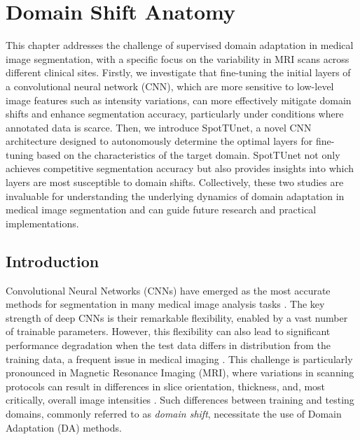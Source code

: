 

\chapter{Domain Shift Anatomy}
\label{chap:mri}


This chapter addresses the challenge of supervised domain adaptation in medical image segmentation, with a specific focus on the variability in MRI scans across different clinical sites. Firstly, we investigate that fine-tuning the initial layers of a convolutional neural network (CNN), which are more sensitive to low-level image features such as intensity variations, can more effectively mitigate domain shifts and enhance segmentation accuracy, particularly under conditions where annotated data is scarce. Then, we introduce SpotTUnet, a novel CNN architecture designed to autonomously determine the optimal layers for fine-tuning based on the characteristics of the target domain. SpotTUnet not only achieves competitive segmentation accuracy but also provides insights into which layers are most susceptible to domain shifts. Collectively, these two studies are invaluable for understanding the underlying dynamics of domain adaptation in medical image segmentation and can guide future research and practical implementations.


\section{Introduction}

Convolutional Neural Networks (CNNs) have emerged as the most accurate methods for segmentation in many medical image analysis tasks \cite{shen2017deep}. The key strength of deep CNNs is their remarkable flexibility, enabled by a vast number of trainable parameters. However, this flexibility can also lead to significant performance degradation when the test data differs in distribution from the training data, a frequent issue in medical imaging \cite{wang2018deep}. This challenge is particularly pronounced in Magnetic Resonance Imaging (MRI), where variations in scanning protocols can result in differences in slice orientation, thickness, and, most critically, overall image intensities \cite{kamnitsas2017unsupervised,glocker2019machine,orbes2019multi}. Such differences between training and testing domains, commonly referred to as \textit{domain shift}, necessitate the use of Domain Adaptation (DA) methods.

